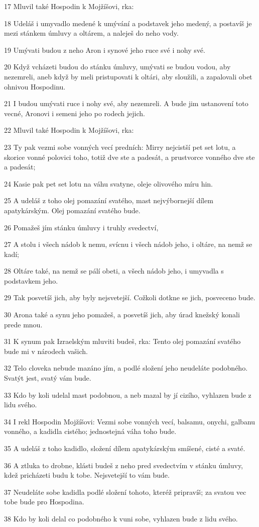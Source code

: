 \par 17 Mluvil také Hospodin k Mojžíšovi, rka:
\par 18 Udeláš i umyvadlo medené k umývání a podstavek jeho medený, a postavíš je mezi stánkem úmluvy a oltárem, a naleješ do neho vody.
\par 19 Umývati budou z neho Aron i synové jeho ruce své i nohy své.
\par 20 Když vcházeti budou do stánku úmluvy, umývati se budou vodou, aby nezemreli, aneb když by meli pristupovati k oltári, aby sloužili, a zapalovali obet ohnivou Hospodinu.
\par 21 I budou umývati ruce i nohy své, aby nezemreli. A bude jim ustanovení toto vecné, Aronovi i semeni jeho po rodech jejich.
\par 22 Mluvil také Hospodin k Mojžíšovi, rka:
\par 23 Ty pak vezmi sobe vonných vecí predních: Mirry nejcistší pet set lotu, a skorice vonné polovici toho, totiž dve ste a padesát, a prustvorce vonného dve ste a padesát;
\par 24 Kasie pak pet set lotu na váhu svatyne, oleje olivového míru hin.
\par 25 A udeláš z toho olej pomazání svatého, mast nejvýbornejší dílem apatykárským. Olej pomazání svatého bude.
\par 26 Pomažeš jím stánku úmluvy i truhly svedectví,
\par 27 A stolu i všech nádob k nemu, svícnu i všech nádob jeho, i oltáre, na nemž se kadí;
\par 28 Oltáre také, na nemž se pálí obeti, a všech nádob jeho, i umyvadla s podstavkem jeho.
\par 29 Tak posvetíš jich, aby byly nejsvetejší. Cožkoli dotkne se jich, posveceno bude.
\par 30 Arona také a synu jeho pomažeš, a posvetíš jich, aby úrad knežský konali prede mnou.
\par 31 K synum pak Izraelským mluviti budeš, rka: Tento olej pomazání svatého bude mi v národech vašich.
\par 32 Telo cloveka nebude mazáno jím, a podlé složení jeho neudeláte podobného. Svatýt jest, svatý vám bude.
\par 33 Kdo by koli udelal mast podobnou, a neb mazal by jí cizího, vyhlazen bude z lidu svého.
\par 34 I rekl Hospodin Mojžíšovi: Vezmi sobe vonných vecí, balsamu, onychi, galbanu vonného, a kadidla cistého; jednostejná váha toho bude.
\par 35 A udeláš z toho kadidlo, složení dílem apatykárským smíšené, cisté a svaté.
\par 36 A ztluka to drobne, klásti budeš z neho pred svedectvím v stánku úmluvy, kdež pricházeti budu k tobe. Nejsvetejší to vám bude.
\par 37 Neudeláte sobe kadidla podlé složení tohoto, kteréž pripravíš; za svatou vec tobe bude pro Hospodina.
\par 38 Kdo by koli delal co podobného k vuni sobe, vyhlazen bude z lidu svého.

